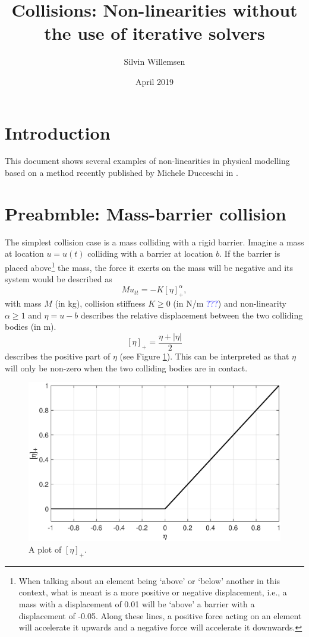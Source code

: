 \documentclass{article}
\title{Collisions: Non-linearities without the use of iterative solvers}
\author{Silvin Willemsen}
\date{April 2019}
\def\SWcomment[#1]{\textcolor{blue}{#1}}
\begin{document}
\ifpdf %
\else  %
\fi

\maketitle

\section{Introduction}
This document shows several examples of non-linearities in physical modelling based on a method recently published by Michele Ducceschi in \cite{Ducceschi2019}.


\section{Preabmble: Mass-barrier collision}
The simplest collision case is a mass colliding with a rigid barrier. Imagine a mass at location $u = u(t)$ colliding with a barrier at location $b$. If the barrier is placed above\footnote{When talking about an element being `above' or `below' another in this context, what is meant is a more positive or negative displacement, i.e., a mass with a displacement of 0.01 will be `above' a barrier with a displacement of -0.05. Along these lines, a positive force acting on an element will accelerate it upwards and a negative force will accelerate it downwards.} the mass, the force it exerts on the mass will be negative and its system would be described as
\begin{equation}\label{eq:massBarrier}
    Mu_{tt} = -K[\eta]_+^\alpha,
\end{equation}
with mass $M$ (in kg), collision stiffness $K \geq 0$ (in N/m \SWcomment[???]) and non-linearity $\alpha \geq 1$ and $\eta = u - b$ describes the relative displacement between the two colliding bodies (in m).
\begin{equation}\label{eq:etaPlus}
    [\eta]_+ = \frac{\eta + |\eta|}{2}
\end{equation}
describes the positive part of $\eta$ (see Figure \ref{fig:eta}). This can be interpreted as that $\eta$ will only be non-zero when the two colliding bodies are in contact.

\begin{figure}[h]
\centerline{\includegraphics[width=0.6\columnwidth]{eta.eps}}
\caption{\label{fig:eta}{A plot of $[\eta]_+$.}}
\end{figure}
\end{document}
